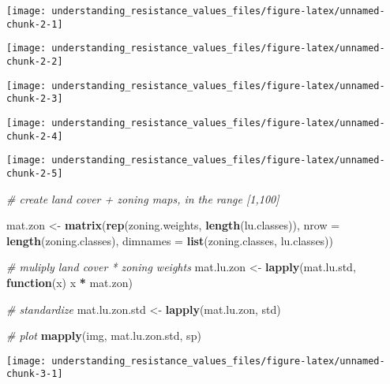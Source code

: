 \documentclass[]{article}
\newenvironment{Shaded}{\begin{snugshade}}{\end{snugshade}}
\newcommand{\CommentTok}[1]{\textcolor[rgb]{0.56,0.35,0.01}{\textit{#1}}}
\newcommand{\ControlFlowTok}[1]{\textcolor[rgb]{0.13,0.29,0.53}{\textbf{#1}}}
\newcommand{\DataTypeTok}[1]{\textcolor[rgb]{0.13,0.29,0.53}{#1}}
\newcommand{\KeywordTok}[1]{\textcolor[rgb]{0.13,0.29,0.53}{\textbf{#1}}}
\newcommand{\NormalTok}[1]{#1}
\newcommand{\OperatorTok}[1]{\textcolor[rgb]{0.81,0.36,0.00}{\textbf{#1}}}
\newcommand{\StringTok}[1]{\textcolor[rgb]{0.31,0.60,0.02}{#1}}
\begin{document}
\begin{center}\texttt{[image: understanding\_resistance\_values\_files/figure-latex/unnamed-chunk-2-1]} \end{center}

\begin{center}\texttt{[image: understanding\_resistance\_values\_files/figure-latex/unnamed-chunk-2-2]} \end{center}

\begin{center}\texttt{[image: understanding\_resistance\_values\_files/figure-latex/unnamed-chunk-2-3]} \end{center}

\begin{center}\texttt{[image: understanding\_resistance\_values\_files/figure-latex/unnamed-chunk-2-4]} \end{center}

\begin{center}\texttt{[image: understanding\_resistance\_values\_files/figure-latex/unnamed-chunk-2-5]} \end{center}

\begin{Shaded}
\begin{Highlighting}[]
\CommentTok{# create land cover + zoning maps, in the range [1,100]}

\NormalTok{mat.zon <-}\StringTok{ }\KeywordTok{matrix}\NormalTok{(}\KeywordTok{rep}\NormalTok{(zoning.weights, }\KeywordTok{length}\NormalTok{(lu.classes)), }\DataTypeTok{nrow =} \KeywordTok{length}\NormalTok{(zoning.classes),}
         \DataTypeTok{dimnames =} \KeywordTok{list}\NormalTok{(zoning.classes, lu.classes))}

\CommentTok{# muliply land cover * zoning weights}
\NormalTok{mat.lu.zon <-}\StringTok{ }\KeywordTok{lapply}\NormalTok{(mat.lu.std, }\ControlFlowTok{function}\NormalTok{(x) x }\OperatorTok{*}\StringTok{ }\NormalTok{mat.zon)}

\CommentTok{# standardize}
\NormalTok{mat.lu.zon.std <-}\StringTok{ }\KeywordTok{lapply}\NormalTok{(mat.lu.zon, std)}

\CommentTok{# plot                     }
\KeywordTok{mapply}\NormalTok{(img, mat.lu.zon.std, sp)}
\end{Highlighting}
\end{Shaded}

\begin{center}\texttt{[image: understanding\_resistance\_values\_files/figure-latex/unnamed-chunk-3-1]} \end{center}
\end{document}
